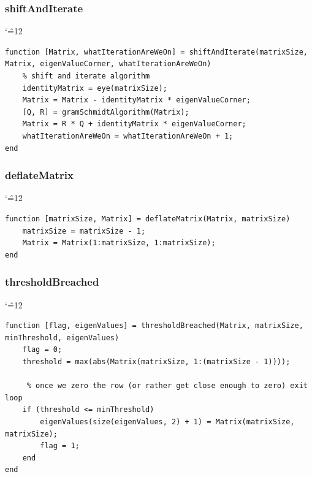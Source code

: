 \documentclass[12pt]{report}
\newenvironment{simplechar}{%
   \catcode`\^=12
}{}
\begin{document}
\subsubsection{shiftAndIterate}
\begin{simplechar}
\begin{lstlisting}
function [Matrix, whatIterationAreWeOn] = shiftAndIterate(matrixSize, Matrix, eigenValueCorner, whatIterationAreWeOn)
    % shift and iterate algorithm
    identityMatrix = eye(matrixSize);
    Matrix = Matrix - identityMatrix * eigenValueCorner;
    [Q, R] = gramSchmidtAlgorithm(Matrix);
    Matrix = R * Q + identityMatrix * eigenValueCorner;
    whatIterationAreWeOn = whatIterationAreWeOn + 1;
end

\end{lstlisting}
\end{simplechar}

\subsubsection{deflateMatrix}
\begin{simplechar}
\begin{lstlisting}
function [matrixSize, Matrix] = deflateMatrix(Matrix, matrixSize)
    matrixSize = matrixSize - 1;
    Matrix = Matrix(1:matrixSize, 1:matrixSize);
end

\end{lstlisting}
\end{simplechar}

\newpage
\subsubsection{thresholdBreached}
\begin{simplechar}
\begin{lstlisting}
function [flag, eigenValues] = thresholdBreached(Matrix, matrixSize, minThreshold, eigenValues)
    flag = 0;
    threshold = max(abs(Matrix(matrixSize, 1:(matrixSize - 1))));

     % once we zero the row (or rather get close enough to zero) exit loop
    if (threshold <= minThreshold)
        eigenValues(size(eigenValues, 2) + 1) = Matrix(matrixSize, matrixSize);
        flag = 1;
    end
end
\end{lstlisting}
\end{simplechar}
\end{document}
